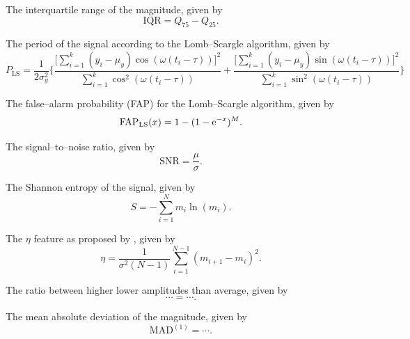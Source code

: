 \begin{enumerate}
 The interquartile range of the magnitude, given by
\begin{equation}\text{IQR} = Q_{75} -Q_{25}.\end{equation}

 The period of the signal according to the Lomb--Scargle algorithm, given by
\begin{equation}P_{\text{LS}} = \frac{1}{2 \sigma_y^2} \Bigg\{ \frac{\big[\sum\limits_{i=1}^k (y_i - \mu_y) \cos(\omega(t_i - \tau))\big]^2}{\sum\limits_{i=1}^k \cos^2(\omega(t_i - \tau))} + \frac{\big[\sum\limits_{i=1}^k (y_i - \mu_y) \sin(\omega(t_i - \tau))\big]^2}{\sum\limits_{i=1}^k \sin^2(\omega(t_i - \tau))}\Bigg\}\end{equation}

 The false--alarm probability (FAP) for the Lomb--Scargle algorithm, given by
\begin{equation}\text{FAP}_{\text{LS}}(x) = 1 - (1 - \mathrm{e}^{-x})^M.\end{equation}

 The signal--to--noise ratio, given by
\begin{equation}\text{SNR} = \frac{\mu}{\sigma}.\end{equation}

 The Shannon entropy of the signal, given by
\begin{equation}S = -\sum\limits_{i=1}^N m_i \ln(m_i).\end{equation}

\litem{$\eta$ ($\cdots$)} The $\eta$ feature as proposed by \citep{}, given by
\begin{equation}\eta = \frac{1}{\sigma^2 (N-1)} \sum\limits_{i=1}^{N-1} (m_{i+1} - m_{i})^2.\end{equation}

 The ratio between higher \resp lower amplitudes than average, given by
\begin{equation}\cdots = \cdots.\end{equation}

 The mean absolute deviation of the magnitude, given by
\begin{equation}\text{MAD}^{(1)} = \cdots.\end{equation}


\end{enumerate}
